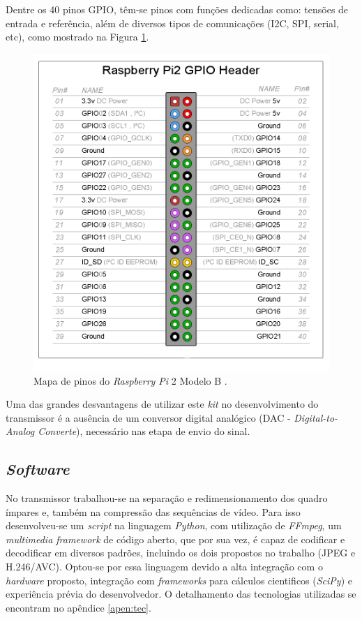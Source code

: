 Dentre os 40 pinos GPIO, têm-se pinos com funções dedicadas como: tensões de entrada e referência, além de diversos tipos de comunicações (I2C, SPI, serial, etc), como mostrado na Figura \ref{fig:rasp_gpio}.

\begin{figure}[h]
	\centering
	\includegraphics[scale=.3]{figuras/GPIO_Pi2.png}
	\caption{ Mapa de pinos do \textit{Raspberry Pi} 2 Modelo B \cite{element14}.}
	\label{fig:rasp_gpio}
\end{figure}

Uma das grandes desvantagens de utilizar este \textit{kit} no desenvolvimento do transmissor é a ausência de um conversor digital analógico (DAC -\textit{ Digital-to-Analog Converte}), necessário nas etapa de envio do sinal.

\subsection{\textit{Software}}

No transmissor trabalhou-se na separação e redimensionamento dos quadro ímpares e, também na compressão das sequências de vídeo. Para isso desenvolveu-se um \textit{script } na linguagem \textit{Python}, com utilização de \textit{FFmpeg}, um \textit{multimedia framework} de código aberto, que por sua vez, é  capaz de codificar e decodificar em diversos padrões, incluindo os dois propostos no trabalho (JPEG e H.246/AVC). Optou-se por essa linguagem devido a alta integração com o \textit{hardware} proposto, integração com \textit{frameworks} para cálculos cientificos (\textit{SciPy}) e experiência prévia do desenvolvedor. O detalhamento das tecnologias utilizadas se encontram no apêndice \ref{apen:tec}.

